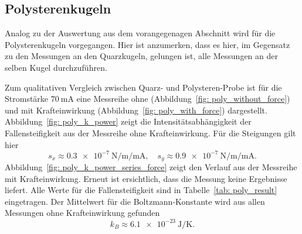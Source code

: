 

\FloatBarrier

\newpage
\subsection{Polysterenkugeln}
Analog zu der Auswertung aus dem vorangegenagen Abschnitt wird für die Polysterenkugeln vorgegangen.
Hier ist anzumerken, dass es hier, im Gegensatz zu den Messungen an den Quarzkugeln, gelungen ist, alle
Messungen an der selben Kugel durchzuführen.

Zum qualitativen Vergleich zwischen Quarz- und Polysteren-Probe ist für die
Stromstärke $\SI{70}{\milli\ampere}$ eine Messreihe ohne (Abbildung~\ref{fig: poly_without_force}) und
mit Krafteinwirkung (Abbildung~\ref{fig: poly_with_force}) dargestellt.
Abbildung~\ref{fig: poly_k_power} zeigt die Intensitätsabhängigkeit der Fallensteifigkeit aus der Messreihe ohne Krafteinwirkung.
Für die Steigungen gilt hier
\begin{equation}
  s_x \approx \SI{0.3e-7}{\newton \per \meter \per \milli\ampere}, \quad s_y \approx \SI{0.9e-7}{\newton \per \meter \per \milli\ampere}.
\end{equation}
Abbildung~\ref{fig: poly_k_power_series_force} zeigt den Verlauf aus der Messreihe mit Krafteinwirkung. Erneut ist ersichtlich, dass die Messung
keine Ergebnisse liefert.
Alle Werte für die Fallensteifigkeit
sind in Tabelle~\ref{tab: poly_result} eingetragen.
Der Mittelwert für die Boltzmann-Konstante wird aus allen Messungen ohne Krafteinwirkung gefunden
\begin{equation}
  k_B \approx \SI{6.1e-23}{\joule\per\kelvin}.
\end{equation}
